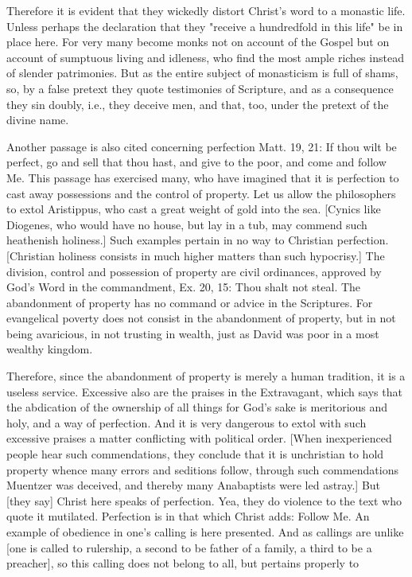 Therefore it is evident that they wickedly distort Christ's word to a
monastic life.  Unless perhaps the declaration that they "receive a
hundredfold in this life" be in place here.  For very many become
monks not on account of the Gospel but on account of sumptuous living
and idleness, who find the most ample riches instead of slender
patrimonies.  But as the entire subject of monasticism is full of
shams, so, by a false pretext they quote testimonies of Scripture,
and as a consequence they sin doubly, i.e., they deceive men, and
that, too, under the pretext of the divine name.

Another passage is also cited concerning perfection Matt. 19, 21: If
thou wilt be perfect, go and sell that thou hast, and give to the
poor, and come and follow Me.  This passage has exercised many, who
have imagined that it is perfection to cast away possessions and the
control of property.  Let us allow the philosophers to extol
Aristippus, who cast a great weight of gold into the sea.  [Cynics
like Diogenes, who would have no house, but lay in a tub, may commend
such heathenish holiness.] Such examples pertain in no way to
Christian perfection.  [Christian holiness consists in much higher
matters than such hypocrisy.] The division, control and possession of
property are civil ordinances, approved by God's Word in the
commandment, Ex. 20, 15: Thou shalt not steal.  The abandonment of
property has no command or advice in the Scriptures.  For evangelical
poverty does not consist in the abandonment of property, but in not
being avaricious, in not trusting in wealth, just as David was poor
in a most wealthy kingdom.

Therefore, since the abandonment of property is merely a human
tradition, it is a useless service.  Excessive also are the praises
in the Extravagant, which says that the abdication of the ownership
of all things for God's sake is meritorious and holy, and a way of
perfection.  And it is very dangerous to extol with such excessive
praises a matter conflicting with political order.  [When
inexperienced people hear such commendations, they conclude that it
is unchristian to hold property whence many errors and seditions
follow, through such commendations Muentzer was deceived, and thereby
many Anabaptists were led astray.] But [they say] Christ here speaks
of perfection.  Yea, they do violence to the text who quote it
mutilated.  Perfection is in that which Christ adds: Follow Me.  An
example of obedience in one's calling is here presented.  And as
callings are unlike [one is called to rulership, a second to be
father of a family, a third to be a preacher], so this calling does
not belong to all, but pertains properly to

